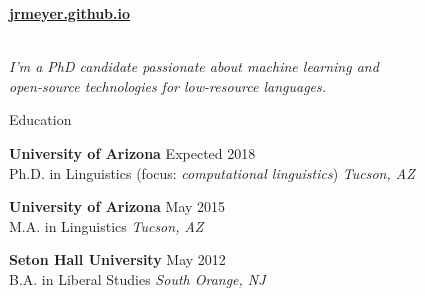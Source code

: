 \documentclass{resume} %
\begin{document}
\vspace{-.25cm}
\begin{center}
  \href{https://jrmeyer.github.io}{\textbf{jrmeyer.github.io}} \\
  \href{https://github.com/JRMeyer}{\faGithub} \\

\vspace{.5cm}

\textit{I'm a PhD candidate passionate about machine learning and \\
open-source technologies for low-resource languages.}
\end{center}


\vspace{.5cm}
\begin{rSection}{Education}

{\bf University of Arizona} \hfill {Expected 2018} \\ 
Ph.D. in Linguistics (focus: \textit{computational linguistics}) \hfill {\em Tucson, AZ}

\vspace{.15cm}

{\bf University of Arizona} \hfill {May 2015} \\ 
M.A. in Linguistics \hfill {\em Tucson, AZ}

\vspace{.15cm}

{\bf Seton Hall University} \hfill {May 2012} \\ 
B.A. in Liberal Studies  \hfill {\em South Orange, NJ} \\



\end{rSection}
\end{document}
